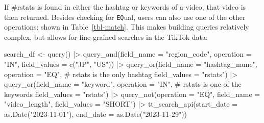 \documentclass[
  nobib]{ccr}
\newenvironment{Shaded}{\begin{snugshade}}{\end{snugshade}}
\newcommand{\AttributeTok}[1]{\textcolor[rgb]{0.40,0.45,0.13}{#1}}
\newcommand{\CommentTok}[1]{\textcolor[rgb]{0.37,0.37,0.37}{#1}}
\newcommand{\FunctionTok}[1]{\textcolor[rgb]{0.28,0.35,0.67}{#1}}
\newcommand{\NormalTok}[1]{\textcolor[rgb]{0.00,0.23,0.31}{#1}}
\newcommand{\OtherTok}[1]{\textcolor[rgb]{0.00,0.23,0.31}{#1}}
\newcommand{\SpecialCharTok}[1]{\textcolor[rgb]{0.37,0.37,0.37}{#1}}
\newcommand{\StringTok}[1]{\textcolor[rgb]{0.13,0.47,0.30}{#1}}
\begin{document}
If \#rstats is found in either the hashtag or keywords of a video, that
video is then returned. Besides checking for \texttt{EQ}ual, users can
also use one of the other operations: shown in Table~\ref{tbl-match}.
This makes building queries relatively complex, but allows for
fine-grained searches in the TikTok data:

\begin{Shaded}
\begin{Highlighting}[]
\NormalTok{search\_df }\OtherTok{\textless{}{-}} \FunctionTok{query}\NormalTok{() }\SpecialCharTok{|\textgreater{}}
  \FunctionTok{query\_and}\NormalTok{(}\AttributeTok{field\_name =} \StringTok{"region\_code"}\NormalTok{,}
            \AttributeTok{operation =} \StringTok{"IN"}\NormalTok{,}
            \AttributeTok{field\_values =} \FunctionTok{c}\NormalTok{(}\StringTok{"JP"}\NormalTok{, }\StringTok{"US"}\NormalTok{)) }\SpecialCharTok{|\textgreater{}}
  \FunctionTok{query\_or}\NormalTok{(}\AttributeTok{field\_name =} \StringTok{"hashtag\_name"}\NormalTok{,}
            \AttributeTok{operation =} \StringTok{"EQ"}\NormalTok{, }\CommentTok{\# rstats is the only hashtag}
            \AttributeTok{field\_values =} \StringTok{"rstats"}\NormalTok{) }\SpecialCharTok{|\textgreater{}}
  \FunctionTok{query\_or}\NormalTok{(}\AttributeTok{field\_name =} \StringTok{"keyword"}\NormalTok{,}
           \AttributeTok{operation =} \StringTok{"IN"}\NormalTok{, }\CommentTok{\# rstats is one of the keywords}
           \AttributeTok{field\_values =} \StringTok{"rstats"}\NormalTok{) }\SpecialCharTok{|\textgreater{}}
  \FunctionTok{query\_not}\NormalTok{(}\AttributeTok{operation =} \StringTok{"EQ"}\NormalTok{,}
            \AttributeTok{field\_name =} \StringTok{"video\_length"}\NormalTok{,}
            \AttributeTok{field\_values =} \StringTok{"SHORT"}\NormalTok{) }\SpecialCharTok{|\textgreater{}}
  \FunctionTok{tt\_search\_api}\NormalTok{(}\AttributeTok{start\_date =} \FunctionTok{as.Date}\NormalTok{(}\StringTok{"2023{-}11{-}01"}\NormalTok{),}
                \AttributeTok{end\_date =} \FunctionTok{as.Date}\NormalTok{(}\StringTok{"2023{-}11{-}29"}\NormalTok{))}


\end{Highlighting}
\end{Shaded}
\end{document}
